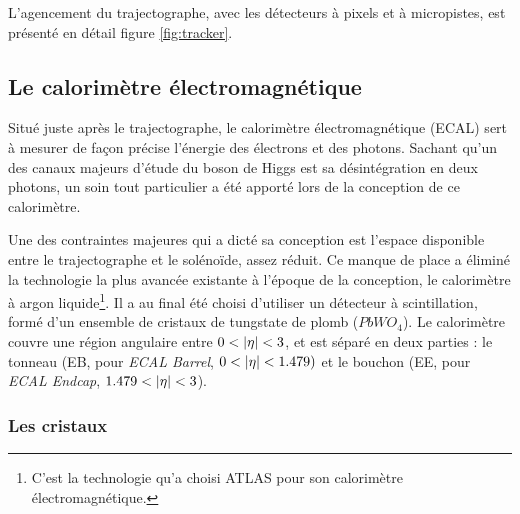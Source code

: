 L'agencement du trajectographe, avec les détecteurs à pixels et à micropistes, est présenté en détail figure \ref{fig:tracker}.

\subsection{Le calorimètre électromagnétique}

Situé juste après le trajectographe, le calorimètre électromagnétique (ECAL) sert à mesurer de façon précise l'énergie des électrons et des photons. Sachant qu'un des canaux majeurs d'étude du boson de Higgs est sa désintégration en deux photons, un soin tout particulier a été apporté lors de la conception de ce calorimètre.

Une des contraintes majeures qui a dicté sa conception est l'espace disponible entre le trajectographe et le solénoïde, assez réduit. Ce manque de place a éliminé la technologie la plus avancée existante à l'époque de la conception, le calorimètre à argon liquide\footnote{C'est la technologie qu'a choisi ATLAS pour son calorimètre électromagnétique.}. Il a au final été choisi d'utiliser un détecteur à scintillation, formé d'un ensemble de cristaux de tungstate de plomb ($PbWO_4$). Le calorimètre couvre une région angulaire entre $0 < \lvert \eta \rvert < 3$, et est séparé en deux parties : le tonneau (EB, pour \emph{ECAL Barrel}, $0 < \lvert \eta \rvert < \num{1.479})$ et le bouchon (EE, pour \emph{ECAL Endcap}, $\num{1.479} < \lvert \eta \rvert < 3$).

\subsubsection{Les cristaux}

